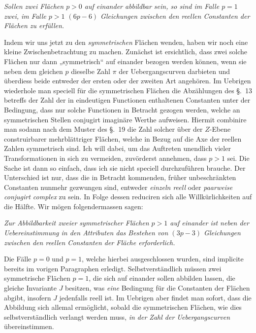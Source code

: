 \documentclass{article}
\begin{document}
\emph{Sollen zwei Flächen $p > 0$ auf einander abbildbar sein, so sind im Falle $p = 1$ zwei, im Falle $p > 1$ $(6p - 6)$ Gleichungen zwischen den reellen Constanten der Flächen zu erfüllen.}

Indem wir uns jetzt zu den \emph{symmetrischen} Flächen wenden, haben wir noch eine kleine Zwischenbetrachtung zu machen. Zunächst ist ersichtlich, dass zwei solche Flächen nur dann „symmetrisch“ auf einander bezogen werden können, wenn sie neben dem gleichen $p$ dieselbe Zahl $\pi$ der Uebergangscurven darbieten und überdiess beide entweder der ersten oder der zweiten Art angehören. Im Uebrigen wiederhole man speciell für die symmetrischen Flächen die Abzählungen des §.~13 betreffs der Zahl der in eindeutigen Functionen enthaltenen Constanten unter der Bedingung, dass nur solche Functionen in Betracht gezogen werden, welche an symmetrischen Stellen conjugirt imaginäre Werthe aufweisen. Hiermit combinire man sodann nach dem Muster des §.~19 die Zahl solcher über der $Z$-Ebene construirbarer mehrblättriger Flächen, welche in Bezug auf die Axe der reellen Zahlen symmetrisch sind. Ich will dabei, um das Auftreten unendlich vieler Transformationen in sich zu vermeiden, zuvörderst annehmen, dass $p > 1$ sei. Die Sache ist dann so einfach, dass ich sie nicht speciell durchzuführen brauche. Der Unterschied ist nur, dass die in Betracht kommenden, früher unbeschränkten Constanten nunmehr gezwungen sind, entweder \emph{einzeln reell} oder \emph{paarweise conjugirt complex} zu sein. In Folge dessen reduciren sich alle Willkürlichkeiten auf die Hälfte. Wir mögen folgendermassen sagen:


\emph{Zur Abbildbarkeit zweier symmetrischer Flächen $p > 1$ auf einander ist neben der Uebereinstimmung in den Attributen das Bestehen von $(3p - 3)$ Gleichungen zwischen den reellen Constanten der Fläche erforderlich.}

Die Fälle $p = 0$ und $p = 1$, welche hierbei ausgeschlossen wurden, sind implicite bereits im vorigen Paragraphen erledigt. Selbstverständlich müssen zwei symmetrische Flächen $p = 1$, die sich auf einander sollen abbilden lassen, die gleiche Invariante $J$ besitzen, was \emph{eine} Bedingung für die Constanten der Flächen abgibt, insofern $J$ jedenfalls reell ist. Im Uebrigen aber findet man sofort, dass die Abbildung sich allemal ermöglicht, sobald die symmetrischen Flächen, wie dies selbstverständlich verlangt werden muss, \emph{in der Zahl der Uebergangscurven} übereinstimmen.
\end{document}
